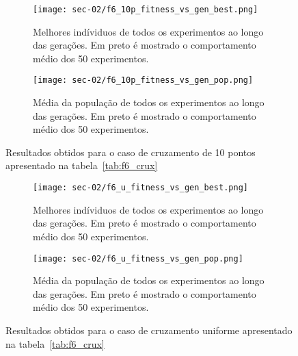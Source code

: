 	\begin{figure}[htb]
	\begin{subfigure}{.45\textwidth}
		\centering
		\texttt{[image: sec-02/f6\_10p\_fitness\_vs\_gen\_best.png]}
		\caption{Melhores indíviduos de todos os experimentos ao longo das gerações.
		Em preto é mostrado o comportamento médio dos 50 experimentos. }
	\end{subfigure}
	\hfill
	\begin{subfigure}{.45\textwidth}
		\centering
		\texttt{[image: sec-02/f6\_10p\_fitness\_vs\_gen\_pop.png]}
		\caption{Média da população de todos os experimentos ao longo das gerações.
		Em preto é mostrado o comportamento médio dos 50 experimentos.}
	\end{subfigure}
	\caption{Resultados obtidos para o caso de cruzamento de 10 pontos apresentado na tabela~\ref{tab:f6_crux}}
\end{figure}


	\begin{figure}[htb]
	\begin{subfigure}{.45\textwidth}
		\centering
		\texttt{[image: sec-02/f6\_u\_fitness\_vs\_gen\_best.png]}
		\caption{Melhores indíviduos de todos os experimentos ao longo das gerações.
		Em preto é mostrado o comportamento médio dos 50 experimentos. }
	\end{subfigure}
	\hfill
	\begin{subfigure}{.45\textwidth}
		\centering
		\texttt{[image: sec-02/f6\_u\_fitness\_vs\_gen\_pop.png]}
		\caption{Média da população de todos os experimentos ao longo das gerações.
		Em preto é mostrado o comportamento médio dos 50 experimentos.}
	\end{subfigure}
	\caption{Resultados obtidos para o caso de cruzamento uniforme apresentado na tabela~\ref{tab:f6_crux}}
\end{figure}
